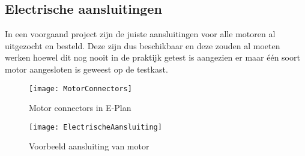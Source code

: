 \newpage

\subsection{Electrische aansluitingen}

In een voorgaand project zijn de juiste aansluitingen voor alle motoren al uitgezocht en besteld. Deze zijn dus beschikbaar en deze zouden al moeten werken hoewel dit nog nooit in de praktijk getest is aangezien er maar één soort motor aangesloten is geweest op de testkast.

\begin{figure}[H]
	\centering
	\texttt{[image: MotorConnectors]}
	\label{fig:MotorConnectors}
	\caption{Motor connectors in E-Plan}
\end{figure}

\begin{figure}[H]
	\centering
	\texttt{[image: ElectrischeAansluiting]}
	\label{fig:MotorAansluiting}
	\caption{Voorbeeld aansluiting van motor}
\end{figure}
